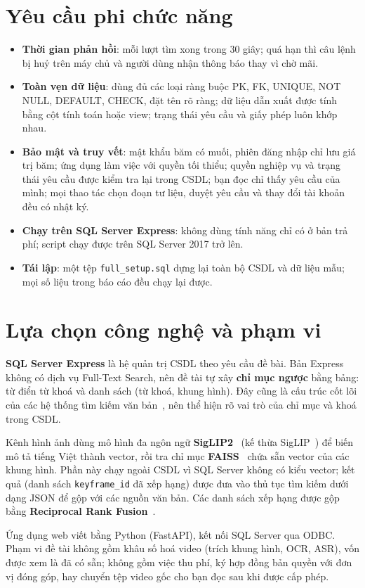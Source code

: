 \section{Yêu cầu phi chức năng}

\begin{itemize}
    \item \textbf{Thời gian phản hồi}: mỗi lượt tìm xong trong 30 giây; quá hạn thì câu lệnh
    bị huỷ trên máy chủ và người dùng nhận thông báo thay vì chờ mãi.
    \item \textbf{Toàn vẹn dữ liệu}: dùng đủ các loại ràng buộc PK, FK, UNIQUE, NOT NULL,
    DEFAULT, CHECK, đặt tên rõ ràng; dữ liệu dẫn xuất được tính bằng cột tính toán hoặc view;
    trạng thái yêu cầu và giấy phép luôn khớp nhau.
    \item \textbf{Bảo mật và truy vết}: mật khẩu băm có muối, phiên đăng nhập chỉ lưu giá trị
    băm; ứng dụng làm việc với quyền tối thiểu; quyền nghiệp vụ và trạng thái yêu cầu được
    kiểm tra lại trong CSDL; bạn đọc chỉ thấy yêu cầu của mình; mọi thao tác chọn đoạn tư
    liệu, duyệt yêu cầu và thay đổi tài khoản đều có nhật ký.
    \item \textbf{Chạy trên SQL Server Express}: không dùng tính năng chỉ có ở bản trả phí;
    script chạy được trên SQL Server 2017 trở lên.
    \item \textbf{Tái lập}: một tệp \texttt{full\_setup.sql} dựng lại toàn bộ CSDL và dữ liệu
    mẫu; mọi số liệu trong báo cáo đều chạy lại được.
\end{itemize}

\section{Lựa chọn công nghệ và phạm vi}

\textbf{SQL Server Express} là hệ quản trị CSDL theo yêu cầu đề bài. Bản Express không có
dịch vụ Full-Text Search, nên đề tài tự xây \textbf{chỉ mục ngược} bằng bảng: từ điển từ
khoá và danh sách (từ khoá, khung hình). Đây cũng là cấu trúc cốt lõi của các hệ thống tìm
kiếm văn bản~\cite{manning2008ir}, nên thể hiện rõ vai trò của chỉ mục và khoá trong CSDL.

Kênh hình ảnh dùng mô hình đa ngôn ngữ \textbf{SigLIP2}~\cite{tschannen2025siglip2} (kế thừa
SigLIP~\cite{zhai2023siglip}) để biến mô tả tiếng Việt thành vector, rồi tra chỉ mục
\textbf{FAISS}~\cite{johnson2021faiss} chứa sẵn vector của các khung hình. Phần này chạy ngoài
CSDL vì SQL Server không có kiểu vector; kết quả (danh sách \texttt{keyframe\_id} đã xếp hạng)
được đưa vào thủ tục tìm kiếm dưới dạng JSON để gộp với các nguồn văn bản. Các danh sách xếp
hạng được gộp bằng \textbf{Reciprocal Rank Fusion}~\cite{cormack2009rrf}.

Ứng dụng web viết bằng Python (FastAPI), kết nối SQL Server qua ODBC. Phạm vi đề tài không
gồm khâu số hoá video (trích khung hình, OCR, ASR), vốn được xem là đã có sẵn; không gồm việc
thu phí, ký hợp đồng bản quyền với đơn vị đóng góp, hay chuyển tệp video gốc cho bạn đọc sau
khi được cấp phép.
